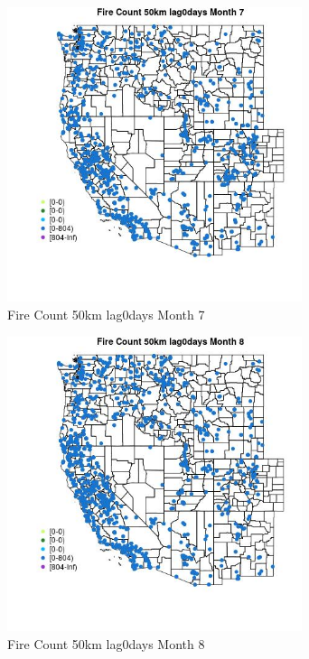 \begin{figure} 
\centering  
\includegraphics[width=0.77\textwidth]{Code_Outputs/Report_ML_input_PM25_Step4_part_f_de_duplicated_aveswNAs_MapObsMo7Fire_Count_50km_lag0days.jpg} 
\caption{\label{fig:Report_ML_input_PM25_Step4_part_f_de_duplicated_aveswNAsMapObsMo7Fire_Count_50km_lag0days}Fire Count 50km lag0days Month 7} 
\end{figure} 
 

\begin{figure} 
\centering  
\includegraphics[width=0.77\textwidth]{Code_Outputs/Report_ML_input_PM25_Step4_part_f_de_duplicated_aveswNAs_MapObsMo8Fire_Count_50km_lag0days.jpg} 
\caption{\label{fig:Report_ML_input_PM25_Step4_part_f_de_duplicated_aveswNAsMapObsMo8Fire_Count_50km_lag0days}Fire Count 50km lag0days Month 8} 
\end{figure} 
 

